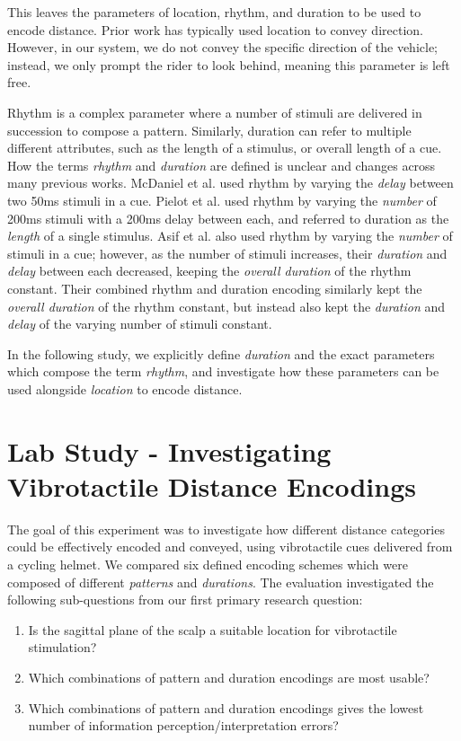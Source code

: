 \documentclass{mpaper}
\begin{document}
This leaves the parameters of location, rhythm, and duration to be used to encode distance. Prior work has typically used location to convey direction. However, in our system, we do not convey the specific direction of the vehicle; instead, we only prompt the rider to look behind, meaning this parameter is left free.

Rhythm is a complex parameter where a number of stimuli are delivered in succession to compose a pattern. Similarly, duration can refer to multiple different attributes, such as the length of a stimulus, or overall length of a cue. How the terms \textit{rhythm} and \textit{duration} are defined is unclear and changes across many previous works. McDaniel et al. \cite{10.1145/1520340.1520718} used rhythm by varying the \textit{delay} between two 50ms stimuli in a cue. Pielot et al. \cite{10.1145/1753326.1753581} used rhythm by varying the \textit{number} of 200ms stimuli with a 200ms delay between each, and referred to duration as the \textit{length} of a single stimulus. Asif et al. \cite{10.1145/1868914.1868923} also used rhythm by varying the \textit{number} of stimuli in a cue; however, as the number of stimuli increases, their \textit{duration} and \textit{delay} between each decreased, keeping the \textit{overall duration} of the rhythm constant. Their combined rhythm and duration encoding similarly kept the \textit{overall duration} of the rhythm constant, but instead also kept the \textit{duration} and \textit{delay} of the varying number of stimuli constant.

In the following study, we explicitly define \textit{duration} and the exact parameters which compose the term \textit{rhythm}, and investigate how these parameters can be used alongside \textit{location} to encode distance.



\section{Lab Study - Investigating Vibrotactile Distance Encodings}\label{sec:lab-study}
The goal of this experiment was to investigate how different distance categories could be effectively encoded and conveyed, using vibrotactile cues delivered from a cycling helmet. We compared six defined encoding schemes which were composed of different \textit{patterns} and \textit{durations}. The evaluation investigated the following sub-questions from our first primary research question:
\begin{enumerate}[label=RQ1.\arabic*.]
    \item Is the sagittal plane of the scalp a suitable location for vibrotactile stimulation?
    \item Which combinations of pattern and duration encodings are most usable?
    \item Which combinations of pattern and duration encodings gives the lowest number of information perception/interpretation errors?
\end{enumerate}
\end{document}
